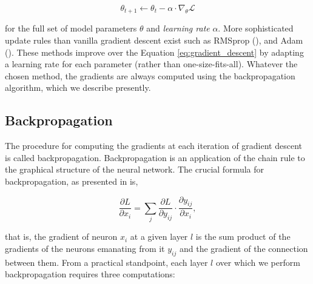 \begin{equation}
\theta_{t+1} \leftarrow \theta_t - \alpha \cdot \nabla_{\theta}\mathcal{L}
\label{eq:gradient_descent}
\end{equation}

for the full set of model parameters $\theta$ and \emph{learning rate} $\alpha$. More sophisticated update rules than vanilla gradient descent exist such as RMSprop (\cite{tieleman2012lecture}), and Adam (\cite{kingma2014adam}). These methods improve over the Equation \ref{eq:gradient_descent} by adapting a learning rate for each parameter (rather than one-size-fits-all). Whatever the chosen method, the gradients are always computed using the backpropagation algorithm, which we describe presently.


\subsection{Backpropagation}

The procedure for computing the gradients at each iteration of gradient descent is called backpropagation. Backpropagation is an application of the chain rule to the graphical structure of the neural network. The crucial formula for backpropagation, as presented in \cite{rumelhart1985learning} is,

\begin{equation}
\frac{\partial L}{\partial x_i} = \sum_j \frac{\partial L}{\partial y_{ij}}\cdot\frac{\partial y_{ij}}{\partial x_i},
\label{eq:backpropagation}
\end{equation}

that is, the gradient of neuron $x_i$ at a given layer $l$ is the sum product of the gradients of the neurons emanating from it $y_{ij}$ and the gradient of the connection between them. From a practical standpoint, each layer $l$ over which we perform backpropagation requires three computations:

